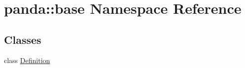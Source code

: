 \hypertarget{namespacepanda_1_1base}{
\section{panda::base Namespace Reference}
\label{namespacepanda_1_1base}
}
\subsection*{Classes}
\begin{DoxyCompactItemize}
\item 
class \hyperlink{classpanda_1_1base_1_1Definition}{Definition}
\end{DoxyCompactItemize}
